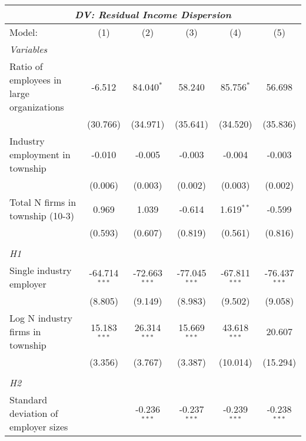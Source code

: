 \begingroup
\centering
\begin{tabular}{lccccc}
   \tabularnewline \multicolumn{6}{c}{\textit{DV: Residual Income Dispersion}} \\ \midrule \midrule
   Model:                                    & (1)             & (2)             & (3)             & (4)             & (5)\\  
   \midrule
   \emph{Variables}\\
   Ratio of employees in large organizations & -6.512          & 84.040$^{*}$    & 58.240          & 85.756$^{*}$    & 56.698\\   
                                             & (30.766)        & (34.971)        & (35.641)        & (34.520)        & (35.836)\\   
   Industry employment in township           & -0.010          & -0.005          & -0.003          & -0.004          & -0.003\\   
                                             & (0.006)         & (0.003)         & (0.002)         & (0.003)         & (0.002)\\   
   Total N firms in township (10-3)          & 0.969           & 1.039           & -0.614          & 1.619$^{**}$    & -0.599\\   
                                             & (0.593)         & (0.607)         & (0.819)         & (0.561)         & (0.816)\\   
\hdashline %
\\[0.1ex] %
\emph{H1} \\ 
   Single industry employer                  & -64.714$^{***}$ & -72.663$^{***}$ & -77.045$^{***}$ & -67.811$^{***}$ & -76.437$^{***}$\\   
                                             & (8.805)         & (9.149)         & (8.983)         & (9.502)         & (9.058)\\   
   Log N industry firms in township          & 15.183$^{***}$  & 26.314$^{***}$  & 15.669$^{***}$  & 43.618$^{***}$  & 20.607\\   
                                             & (3.356)         & (3.767)         & (3.387)         & (10.014)        & (15.294)\\   
\hdashline %
\\[0.1ex] %
\emph{H2} \\ 
   Standard deviation of employer sizes      &                 & -0.236$^{***}$  & -0.237$^{***}$  & -0.239$^{***}$  & -0.238$^{***}$\\   

\end{tabular}
